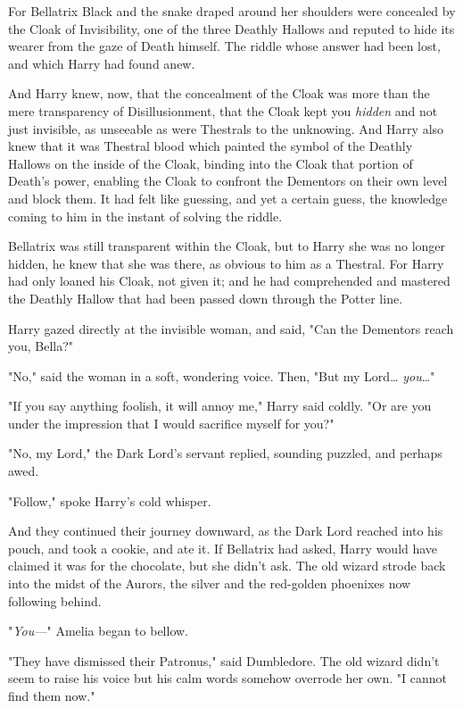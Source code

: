 For Bellatrix Black and the snake draped around her shoulders were concealed by 
the Cloak of Invisibility, one of the three Deathly Hallows and reputed to hide 
its wearer from the gaze of Death himself. The riddle whose answer had been 
lost, and which Harry had found anew.

And Harry knew, now, that the concealment of the Cloak was more than the mere 
transparency of Disillusionment, that the Cloak kept you \emph{hidden} and not 
just invisible, as unseeable as were Thestrals to the unknowing. And Harry also 
knew that it was Thestral blood which painted the symbol of the Deathly Hallows 
on the inside of the Cloak, binding into the Cloak that portion of Death's 
power, enabling the Cloak to confront the Dementors on their own level and 
block them. It had felt like guessing, and yet a certain guess, the knowledge 
coming to him in the instant of solving the riddle.

Bellatrix was still transparent within the Cloak, but to Harry she was no 
longer hidden, he knew that she was there, as obvious to him as a Thestral. For 
Harry had only loaned his Cloak, not given it; and he had comprehended and 
mastered the Deathly Hallow that had been passed down through the Potter line.

Harry gazed directly at the invisible woman, and said, "Can the Dementors reach 
you, Bella?"

"No," said the woman in a soft, wondering voice. Then, "But my Lord{\ldots} 
\emph{you}{\ldots}"

"If you say anything foolish, it will annoy me," Harry said coldly. "Or are you 
under the impression that I would sacrifice myself for you?"

"No, my Lord," the Dark Lord's servant replied, sounding puzzled, and perhaps 
awed.

"Follow," spoke Harry's cold whisper.

And they continued their journey downward, as the Dark Lord reached into his 
pouch, and took a cookie, and ate it. If Bellatrix had asked, Harry would have 
claimed it was for the chocolate, but she didn't ask.
\sbreak
The old wizard strode back into the midst of the Aurors, the silver and the 
red-golden phoenixes now following behind.

"\emph{You---}" Amelia began to bellow.

"They have dismissed their Patronus," said Dumbledore. The old wizard didn't 
seem to raise his voice but his calm words somehow overrode her own. "I cannot 
find them now."

